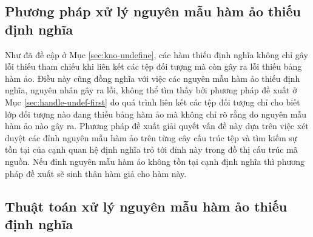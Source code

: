 %         
%         

\subsection{Phương pháp xử lý nguyên mẫu hàm ảo thiếu định nghĩa} \label{sec:handle-undef-second}
Như đã đề cập ở Mục \ref{sec:kno-undefine}, các hàm thiếu định nghĩa không chỉ gây lỗi thiếu tham chiếu khi liên kết các tệp đối tượng mà còn gây ra lỗi thiếu bảng hàm ảo. Điều này cũng đồng nghĩa với việc các nguyên mẫu hàm ảo thiếu định nghĩa, nguyên nhân gây ra lỗi, không thể tìm thấy bởi phương pháp đề xuất ở Mục \ref{sec:handle-undef-first} do quá trình liên kết các tệp đối tượng chỉ cho biết lớp đối tượng nào đang thiếu bảng hàm ảo mà không chỉ rõ rằng do nguyên mẫu hàm ảo nào gây ra. Phương pháp đề xuất giải quyết vấn đề này dựa trên việc xét duyệt các đỉnh nguyên mẫu hàm ảo trên từng cây cấu trúc tệp và tìm kiếm sự tồn tại của cạnh quan hệ định nghĩa trỏ tới đỉnh này trong đồ thị cấu trúc mã nguồn. Nếu đỉnh nguyên mẫu hàm ảo không tồn tại cạnh định nghĩa thì phương pháp đề xuất sẽ sinh thân hàm giả cho hàm này.

\subsection*{Thuật toán xử lý nguyên mẫu hàm ảo thiếu định nghĩa}


